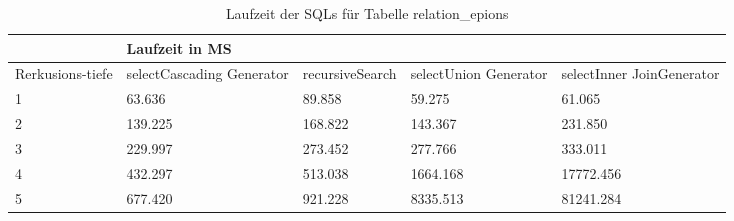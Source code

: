 \begin{table}[H]
	\begin{tabular}{l|l|l|l|l|l|}
		\cline{2-6}
		& \multicolumn{5}{|l|}{Laufzeit in MS}                                                                                                                                                  \\ \hline
		\multicolumn{1}{|l|}{\multirow{2}{2cm}{Rerkusions-tiefe}} & \multicolumn{2}{|l|}{\multirow{2}{3cm}{selectCascading Generator}} & \multirow{2}{2.8cm}{recursiveSearch} & \multirow{2}{2.5cm}{selectUnion Generator} & \multirow{2}{2.5cm}{selectInner JoinGenerator} \\
		\multicolumn{1}{|l|}{}
		& \multicolumn{2}{|l|}{}                                           &                                  &                                     &                                           \\ \hline
	\multicolumn{1}{|l|}{1}               & \multicolumn{2}{l|}{63.636}                                     & 89.858                           & 59.275                              & 61.065                                    \\ \hline
	\multicolumn{1}{|l|}{2}               & \multicolumn{2}{l|}{139.225}                                    & 168.822                          & 143.367                             & 231.850                                   \\ \hline
	\multicolumn{1}{|l|}{3}               & \multicolumn{2}{l|}{229.997}                                    & 273.452                          & 277.766                             & 333.011                                   \\ \hline
	\multicolumn{1}{|l|}{4}               & \multicolumn{2}{l|}{432.297}                                    & 513.038                          & 1664.168                            & 17772.456                                 \\ \hline
	\multicolumn{1}{|l|}{5}               & \multicolumn{2}{l|}{677.420}                                    & 921.228                          & 8335.513                            & 81241.284                                 \\ \hline
	
	\end{tabular}
	\caption{Laufzeit der SQLs für Tabelle relation\_epions}
	\label{2.relationepinions.table}
\end{table}

